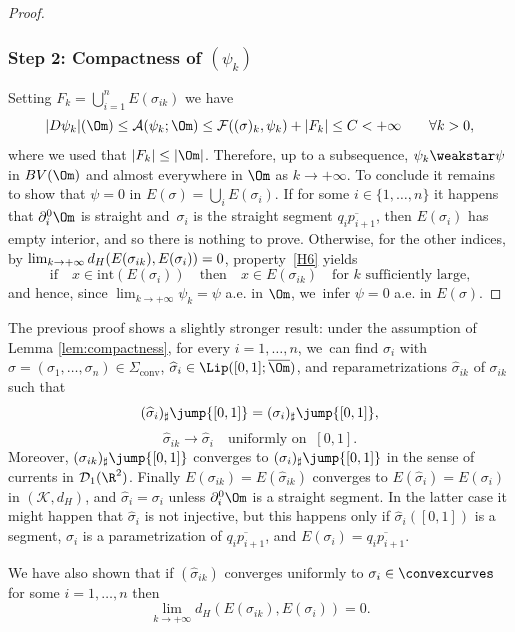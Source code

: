 \begin{proof}
\subsubsection*{Step 2: Compactness of $(\psi_k)$}
Setting $F_k=\bigcup_{i=1}^nE(\sigma_{ik})$ we have
\begin{equation*}
|D\psi_k|(\Om)\le \mathcal{A}(\psi_k;\Om)\le \mathcal{F}((\sigma)_k,\psi_k)+|F_k|\le C<+\infty \qquad \forall k>0,
\end{equation*}
where we used that $|F_k|\le |\Om|$. Therefore,
up to a subsequence, $\psi_k\weakstar\psi$ in $BV(\Om)$ and almost everywhere in $\Om$ as $k \to +\infty$.
To conclude it remains to show that \hbox{$\psi=0$} in $E(\sigma)=\bigcup_iE(\sigma_{i})$. If for some $i\in \{1,\dots,n\}$ it happens that $\partial_i^0\Om$ is straight and~$\sigma_i$ is the straight segment $\overline{q_{i}p_{i+1}}$, then $E(\sigma_i)$ has empty interior, and so there is nothing to prove. Otherwise, for the other indices, by $\lim_{k \to +\infty}d_H(E(\sigma_{ik}),E(\sigma_i))=\nobreak0$,
property~\ref{H6} yields
\begin{equation*}
\text{if}\quad x\in \text{int}(E(\sigma_i)) \quad \text{then}\quad x\in E(\sigma_{ik})\quad\text{for $k$ sufficiently large,}
\end{equation*}
and hence, since $\lim_{k\to +\infty} \psi_k= \psi$ a.e. in $\Om$, we~infer $\psi=0$ a.e. in $ E(\sigma)$.
\end{proof}

\begin{remark}\label{remark_uniform}
The previous proof shows a slightly stronger result: under the assumption of Lemma \ref{lem:compactness},
for every $i=1,\dots,n$, we~can find $\sigma_i$ with $\sigma=
(\sigma_1,\dots,\sigma_n)\in \Sigma_\mathrm{conv}$, $\widehat \sigma_i\in\Lip([0,1];\overline\Om)$, and
reparametrizations $\widehat\sigma_{ik}$ of $\sigma_{ik}$ such that
\[
(\widehat \sigma_i)_\sharp\jump{[0,1]}=(\sigma_i)_\sharp\jump{[0,1]},
\]
\[
\widehat\sigma_{ik}\to\widehat \sigma_i\quad\text{uniformly on }\ [0,1].
\]
Moreover, $( \sigma_{ik})_\sharp\jump{[0,1]}$ converges to $( \sigma_i)_\sharp\jump{[0,1]}$ in the sense of currents in $\mathcal D_1(\R^2)$.
Finally $E(\sigma_{ik})=E(\widehat\sigma_{ik})$ converges to $ E(\widehat \sigma_i)= E( \sigma_i)$ in $(\mathcal K,d_H)$, and $\widehat \sigma_i=\sigma_i$ unless $\partial_i^0\Om$ is a straight segment. In the latter case it might happen that $\widehat \sigma_i$ is not injective, but this
happens only if $\widehat \sigma_i([0,1])$ is a segment, $\sigma_i$ is a parametrization of $\overline{q_ip_{i+1}}$, and $E(\sigma_i)=\overline{q_ip_{i+1}}$.
\end{remark}
\begin{remark}\label{rem:conv}
We have also shown that if $(\widehat\sigma_{ik})$ converges uniformly to $\sigma_i\in\convexcurves$ for some $i=1,\dots,n$ then
\[
\lim_{k \to +\infty}
d_H(E(\sigma_{ik}),E(\sigma_i))= 0.
\]
\end{remark}

